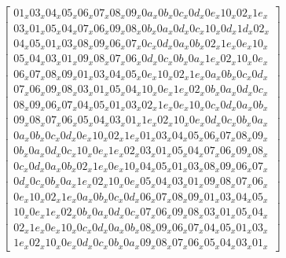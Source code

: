 \begin{equation}\label{mat:elcio}
\begin{bmatrix}
01_x 03_x 04_x 05_x 06_x 07_x 08_x 09_x 0a_x 0b_x 0c_x 0d_x 0e_x 10_x 02_x 1e_x\\
03_x 01_x 05_x 04_x 07_x 06_x 09_x 08_x 0b_x 0a_x 0d_x 0c_x 10_x 0d_x 1d_x 02_x\\
04_x 05_x 01_x 03_x 08_x 09_x 06_x 07_x 0c_x 0d_x 0a_x 0b_x 02_x 1e_x 0e_x 10_x\\
05_x 04_x 03_x 01_x 09_x 08_x 07_x 06_x 0d_x 0c_x 0b_x 0a_x 1e_x 02_x 10_x 0e_x\\
06_x 07_x 08_x 09_x 01_x 03_x 04_x 05_x 0e_x 10_x 02_x 1e_x 0a_x 0b_x 0c_x 0d_x\\
07_x 06_x 09_x 08_x 03_x 01_x 05_x 04_x 10_x 0e_x 1e_x 02_x 0b_x 0a_x 0d_x 0c_x\\
08_x 09_x 06_x 07_x 04_x 05_x 01_x 03_x 02_x 1e_x 0e_x 10_x 0c_x 0d_x 0a_x 0b_x\\
09_x 08_x 07_x 06_x 05_x 04_x 03_x 01_x 1e_x 02_x 10_x 0e_x 0d_x 0c_x 0b_x 0a_x\\
0a_x 0b_x 0c_x 0d_x 0e_x 10_x 02_x 1e_x 01_x 03_x 04_x 05_x 06_x 07_x 08_x 09_x\\
0b_x 0a_x 0d_x 0c_x 10_x 0e_x 1e_x 02_x 03_x 01_x 05_x 04_x 07_x 06_x 09_x 08_x\\
0c_x 0d_x 0a_x 0b_x 02_x 1e_x 0e_x 10_x 04_x 05_x 01_x 03_x 08_x 09_x 06_x 07_x\\
0d_x 0c_x 0b_x 0a_x 1e_x 02_x 10_x 0e_x 05_x 04_x 03_x 01_x 09_x 08_x 07_x 06_x\\
0e_x 10_x 02_x 1e_x 0a_x 0b_x 0c_x 0d_x 06_x 07_x 08_x 09_x 01_x 03_x 04_x 05_x\\
10_x 0e_x 1e_x 02_x 0b_x 0a_x 0d_x 0c_x 07_x 06_x 09_x 08_x 03_x 01_x 05_x 04_x\\
02_x 1e_x 0e_x 10_x 0c_x 0d_x 0a_x 0b_x 08_x 09_x 06_x 07_x 04_x 05_x 01_x 03_x\\
1e_x 02_x 10_x 0e_x 0d_x 0c_x 0b_x 0a_x 09_x 08_x 07_x 06_x 05_x 04_x 03_x 01_x
\end{bmatrix}
\end{equation}
